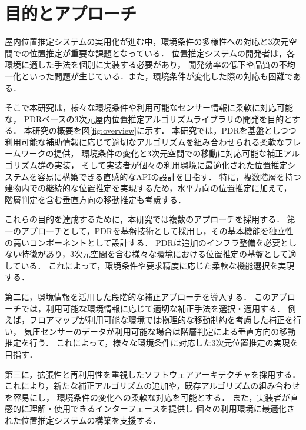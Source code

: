 

\section{目的とアプローチ}

屋内位置推定システムの実用化が進む中，環境条件の多様性への対応と3次元空間での位置推定が重要な課題となっている．
位置推定システムの開発者は，各環境に適した手法を個別に実装する必要があり，
開発効率の低下や品質の不均一化といった問題が生じている．また，環境条件が変化した際の対応も困難である．

そこで本研究は，様々な環境条件や利用可能なセンサー情報に柔軟に対応可能な，
PDRベースの3次元屋内位置推定アルゴリズムライブラリの開発を目的とする．
本研究の概要を図\ref{fig:overview}に示す．
本研究では，PDRを基盤としつつ利用可能な補助情報に応じて適切なアルゴリズムを組み合わせられる柔軟なフレームワークの提供，
環境条件の変化と3次元空間での移動に対応可能な補正アルゴリズム群の実装，
そして実装者が個々の利用環境に最適化された位置推定システムを容易に構築できる直感的なAPIの設計を目指す．
特に，複数階層を持つ建物内での継続的な位置推定を実現するため，水平方向の位置推定に加えて，
階層判定を含む垂直方向の移動推定も考慮する．

これらの目的を達成するために，本研究では複数のアプローチを採用する．
第一のアプローチとして，PDRを基盤技術として採用し，その基本機能を独立性の高いコンポーネントとして設計する．
PDRは追加のインフラ整備を必要としない特徴があり，3次元空間を含む様々な環境における位置推定の基盤として適している．
これによって，環境条件や要求精度に応じた柔軟な機能選択を実現する．

第二に，環境情報を活用した段階的な補正アプローチを導入する．
このアプローチでは，利用可能な環境情報に応じて適切な補正手法を選択・適用する．
例えば，フロアマップが利用可能な環境では物理的な移動制約を考慮した補正を行い，
気圧センサーのデータが利用可能な場合は階層判定による垂直方向の移動推定を行う．
これによって，様々な環境条件に対応した3次元位置推定の実現を目指す．

第三に，拡張性と再利用性を重視したソフトウェアアーキテクチャを採用する．
これにより，新たな補正アルゴリズムの追加や，既存アルゴリズムの組み合わせを容易にし，
環境条件の変化への柔軟な対応を可能とする．
また，実装者が直感的に理解・使用できるインターフェースを提供し
個々の利用環境に最適化された位置推定システムの構築を支援する．

